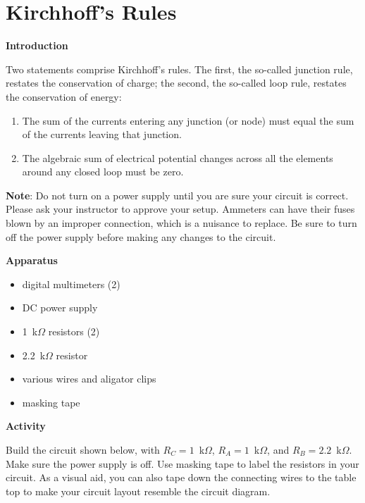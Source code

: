 \section{Kirchhoff's Rules}

\makelabheader %

\bigskip
\textbf{Introduction}

Two statements comprise Kirchhoff's rules. The first, the so-called
junction rule, restates the conservation of charge; the second, the
so-called loop rule, restates the conservation of energy:

\begin{enumerate}
\item The sum of the currents entering any junction (or node) must equal
the sum of the currents leaving that junction.
\item The algebraic sum of electrical potential changes across all the elements
around any closed loop must be zero.
\end{enumerate}
\textbf{Note}: Do not turn on a power supply until you are sure your
circuit is correct. Please ask your instructor to approve your setup.
Ammeters can have their fuses blown by an improper connection, which is a nuisance to replace.
Be sure to turn off the power supply before making any changes to
the circuit.

\bigskip
\textbf{Apparatus}

\begin{itemize}[nosep]
\item digital multimeters (2)
\item DC power supply
\item 1~k$\Omega$ resistors (2)
\item 2.2~k$\Omega$ resistor
\item various wires and aligator clips
\item masking tape
\end{itemize}

\bigskip
\textbf{Activity}

Build the circuit shown below, with $R_C = 1$~k$\Omega$, $R_A = 1$~k$\Omega$, and $R_B = 2.2$~k$\Omega$. Make sure the power supply is off. Use masking tape to label the resistors in your circuit. As a visual aid, you can also tape down the connecting wires to the table top to make your circuit layout resemble the circuit diagram.

